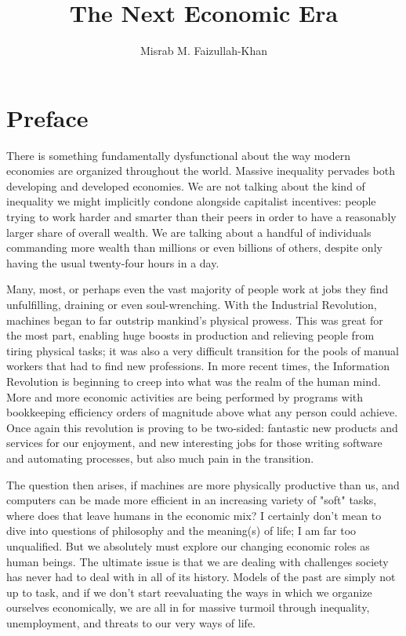 \documentclass[12pt]{memoir}
\begin{document}
	\title{The Next Economic Era}
	\date{}
	\author{Misrab M. Faizullah-Khan}
	
	\maketitle
	
	\chapter*{Preface}
		
		There is something fundamentally dysfunctional about the way modern economies are organized throughout the world. Massive inequality pervades both developing and developed economies. 
		We are not talking about the kind of inequality we might implicitly condone alongside capitalist incentives: people trying to work harder and smarter than their peers in order to 
		have a reasonably larger share of overall wealth. We are talking about a handful of individuals commanding more wealth than millions or even billions of others, 
		despite only having the usual twenty-four hours in a day.\
		
		Many, most, or perhaps even the vast majority of people work at jobs they find unfulfilling, draining or even soul-wrenching. With the Industrial Revolution, machines  began to far outstrip mankind's 
		physical prowess. This was great for the most part, enabling huge boosts in production and relieving people from tiring physical tasks; it was also a very difficult transition for the pools of manual workers 
		that had to find new professions. In more recent times, the Information Revolution is beginning to creep into what was the realm of the human mind. More and more economic activities are being 
		performed by programs with bookkeeping efficiency orders of magnitude above what any person could achieve. Once again this revolution is proving to be two-sided: fantastic new products and services 
		for our enjoyment, and new interesting jobs for those writing software and automating processes, but also much pain in the transition.\
		
		The question then arises, if machines are more physically productive than us, and computers can be made more efficient in an increasing variety of "soft" tasks, where does that leave humans in the economic 
		mix? I certainly don't mean to dive into questions of philosophy and the meaning(s) of life; I am far too unqualified. But we absolutely must explore our changing economic roles as human beings. The 
		ultimate issue is that we are dealing with challenges society has never had to deal with in all of its history. Models of the past are simply not up to task, and if we don't start reevaluating the ways in which 
		we organize ourselves economically, we are all in for massive turmoil through inequality, unemployment, and threats to our very ways of life.\
		
\end{document}
